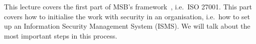 This lecture covers the first part of MSB's framework~\cite{%
  MSB2011itm,MSB2011sle,MSB2011p,MSB2011v,MSB2011r%
}, i.e.~ISO 27001.
This part covers how to initialise the work with security in an organisation, 
i.e.~how to set up an Information Security Management System (ISMS).
We will talk about the most important steps in this process.

